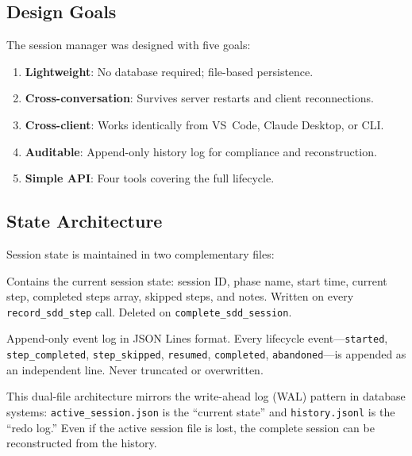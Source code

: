 \documentclass[11pt,letterpaper]{article}
\begin{document}
\subsection{Design Goals}

The session manager was designed with five goals:

\begin{enumerate}[nosep]
    \item \textbf{Lightweight}: No database required; file-based persistence.
    \item \textbf{Cross-conversation}: Survives server restarts and client reconnections.
    \item \textbf{Cross-client}: Works identically from VS~Code, Claude Desktop, or CLI.
    \item \textbf{Auditable}: Append-only history log for compliance and reconstruction.
    \item \textbf{Simple API}: Four tools covering the full lifecycle.
\end{enumerate}

\subsection{State Architecture}

Session state is maintained in two complementary files:

\begin{description}[nosep]
    \item[\texttt{active\_session.json}]
    Contains the current session state: session ID, phase name, start time,
    current step, completed steps array, skipped steps, and notes.
    Written on every \texttt{record\_sdd\_step} call.  Deleted on
    \texttt{complete\_sdd\_session}.

    \item[\texttt{history.jsonl}]
    Append-only event log in JSON Lines format.  Every lifecycle
    event---\texttt{started}, \texttt{step\_completed},
    \texttt{step\_skipped}, \texttt{resumed}, \texttt{completed},
    \texttt{abandoned}---is appended as an independent line.
    Never truncated or overwritten.
\end{description}

This dual-file architecture mirrors the write-ahead log (WAL) pattern
in database systems: \texttt{active\_session.json} is the ``current
state'' and \texttt{history.jsonl} is the ``redo log.''  Even if the
active session file is lost, the complete session can be reconstructed
from the history.
\end{document}
